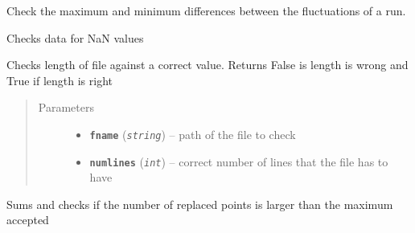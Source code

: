 \documentclass[a4paper,10pt,oneside]{sphinxmanual}
\begin{document}
\begin{fulllineitems}
\label{pymicra:pymicra.tests.check_maxdif}
Check the maximum and minimum differences between the fluctuations of a run.

\end{fulllineitems}


\begin{fulllineitems}
\label{pymicra:pymicra.tests.check_nans}
Checks data for NaN values

\end{fulllineitems}


\begin{fulllineitems}
\label{pymicra:pymicra.tests.check_numlines}
Checks length of file against a correct value.
Returns False is length is wrong and True if length is right
\begin{quote}\begin{description}
\item[{Parameters}] \leavevmode\begin{itemize}
\item {} 
\textbf{\texttt{fname}} (\emph{\texttt{string}}) -- path of the file to check

\item {} 
\textbf{\texttt{numlines}} (\emph{\texttt{int}}) -- correct number of lines that the file has to have

\end{itemize}

\end{description}\end{quote}

\end{fulllineitems}


\begin{fulllineitems}
\label{pymicra:pymicra.tests.check_replaced}
Sums and checks if the number of replaced points is larger than the
maximum accepted

\end{fulllineitems}
\end{document}

